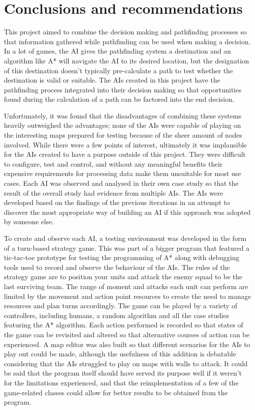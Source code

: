\documentclass[11pt, a4paper]{report}
\begin{document}
\section{Conclusions and recommendations}
\label{sec:conclusionsAndRecommendations}

This project aimed to combine the decision making and pathfinding processes so that information gathered while pathfinding can be used when making a decision. In a lot of games, the AI gives the pathfinding system a destination and an algorithm like A* will navigate the AI to its desired location, but the designation of this destination doesn't typically pre-calculate a path to test whether the destination is valid or suitable. The AIs created in this project have the pathfinding process integrated into their decision making so that opportunities found during the calculation of a path can be factored into the end decision.

Unfortunately, it was found that the disadvantages of combining these systems heavily outweighed the advantages; none of the AIs were capable of playing on the interesting maps prepared for testing because of the sheer amount of nodes involved. While there were a few points of interest, ultimately it was implausible for the AIs created to have a purpose outside of this project. They were difficult to configure, test and control, and without any meaningful benefits their expensive requirements for processing data make them unsuitable for most use cases. Each AI was observed and analysed in their own case study so that the result of the overall study had evidence from multiple AIs. The AIs were developed based on the findings of the previous iterations in an attempt to discover the most appropriate way of building an AI if this approach was adopted by someone else.

To create and observe each AI, a testing environment was developed in the form of a turn-based strategy game. This was part of a bigger program that featured a tic-tac-toe prototype for testing the programming of A* along with debugging tools used to record and observe the behaviour of the AIs. The rules of the strategy game are to position your units and attack the enemy squad to be the last surviving team. The range of moment and attacks each unit can perform are limited by the movement and action point resources to create the need to manage resources and plan turns accordingly. The game can be played by a variety of controllers, including humans, a random algorithm and all the case studies featuring the A* algorithm. Each action performed is recorded so that states of the game can be revisited and altered so that alternative courses of action can be experienced. A map editor was also built so that different scenarios for the AIs to play out could be made, although the usefulness of this addition is debatable considering that the AIs struggled to play on maps with walls to attack. It could be said that the program itself should have served its purpose well if it weren't for the limitations experienced, and that the reimplementation of a few of the game-related classes could allow for better results to be obtained from the program.
\end{document}
